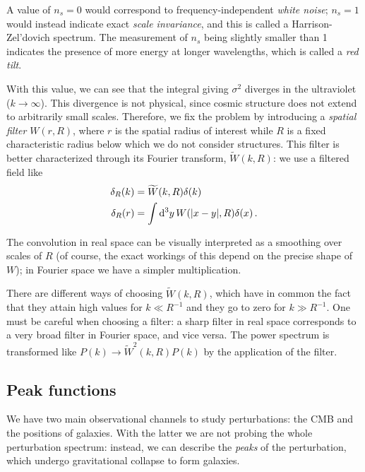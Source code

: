 \documentclass[main.tex]{subfiles}
\begin{document}
A value of \(n_s = 0\) would correspond to frequency-independent \emph{white noise}; \(n_s = 1\) would instead indicate exact \emph{scale invariance}, and this is called a Harrison-Zel'dovich spectrum.
The measurement of \(n_s\) being slightly smaller than 1 indicates the presence of more energy at longer wavelengths, which is called a \emph{red tilt}. 

With this value, we can see that the integral giving \(\sigma^2\) diverges in the ultraviolet (\(k \to \infty\)). 
This divergence is not physical, since cosmic structure does not extend to arbitrarily small scales. Therefore, we fix the problem by introducing a \emph{spatial filter} \(W(r, R)\), where \(r\) is the spatial radius of interest while \(R\) is a fixed characteristic radius below which we do not consider structures. This filter is better characterized through its Fourier transform, \(\widetilde{W}(k, R)\): we use a filtered field like 
%
\begin{align}
\delta_R (k) &= \widetilde{W}(k, R) \delta (k)  \\
\delta _R(r) &= \int \dd[3]{y} W(\abs{x-y}, R) \delta (x)
\,.
\end{align}

The convolution in real space can be visually interpreted as a smoothing over scales of \(R\) (of course, the exact workings of this depend on the precise shape of \(W\)); in Fourier space we have a simpler multiplication.

There are different ways of choosing \(\widetilde{W}(k, R)\), which have in common the fact that they attain high values for \(k \ll R^{-1}\) and they go to zero for \(k \gg R^{-1}\). 
One must be careful when choosing a filter: a sharp filter in real space corresponds to a very broad filter in Fourier space, and vice versa. 
The power spectrum is transformed like \(P(k) \to \widetilde{W}^2(k, R) P(k)\) by the application of the filter.

\subsection{Peak functions}

We have two main observational channels to study perturbations: the CMB and the positions of galaxies.
With the latter we are not probing the whole perturbation spectrum: instead, we can describe the \emph{peaks} of the perturbation, which undergo gravitational collapse to form galaxies. 
\end{document}
